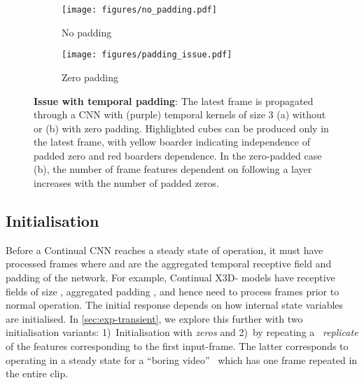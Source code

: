 \documentclass[runningheads]{llncs}
\begin{document}
\vspace{-10pt}
\begin{figure}[t]
     \centering
     \begin{subfigure}[b]{0.48\linewidth}
         \centering
         \texttt{[image: figures/no\_padding.pdf]}
         \caption{No padding}
         \label{fig:no_pad}
     \end{subfigure}
     \hfill
     \begin{subfigure}[b]{0.48\linewidth}
         \centering
         \texttt{[image: figures/padding\_issue.pdf]}
         \caption{Zero padding}
         \label{fig:padding_issue}
     \end{subfigure}
        \vspace{-5pt}
        \caption{\textbf{Issue with temporal padding}: The latest frame  is propagated through a CNN with (purple) temporal kernels of size 3 (a) without or (b) with zero padding. Highlighted cubes can be produced only in the latest frame, with yellow boarder indicating independence of padded zero and red boarders dependence. In the zero-padded case (b), the number of frame features dependent on  following a layer  increases with the number of padded zeros.}
        \label{fig:padding}
        \vspace{-5mm}
\end{figure}


\subsection{Initialisation}\label{sec:init}
Before a Continual CNN reaches a steady state of operation, it must have processed  frames where  and  are the aggregated temporal receptive field and padding of the network.
For example, Continual X3D- models have receptive fields of size , aggregated padding , and hence need to process  frames prior to normal operation.
The initial response depends on how internal state variables are initialised. In \cref{sec:exp-transient}, we explore this further with two initialisation variants: 
1)~Initialisation with \textit{zeros} and 
2)~by repeating a ~\textit{replicate} of the features corresponding to the first input-frame. 
The latter corresponds to operating in a steady state for a ``boring video''~\cite{carreira2017quo} which has one frame repeated in the entire clip.
\end{document}
